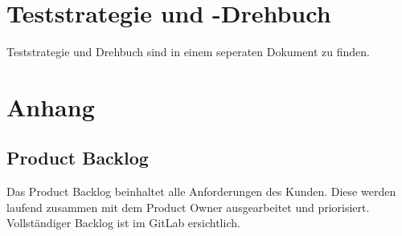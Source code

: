 \documentclass[11pt]{article}
\begin{document}
\section{Teststrategie und -Drehbuch}
Teststrategie und Drehbuch sind in einem seperaten Dokument zu finden.

\section{Anhang}


\subsection{Product Backlog}
Das Product Backlog beinhaltet alle Anforderungen des Kunden. Diese werden laufend zusammen mit dem Product Owner ausgearbeitet und priorisiert. Vollständiger Backlog ist im GitLab ersichtlich.
\end{document}
